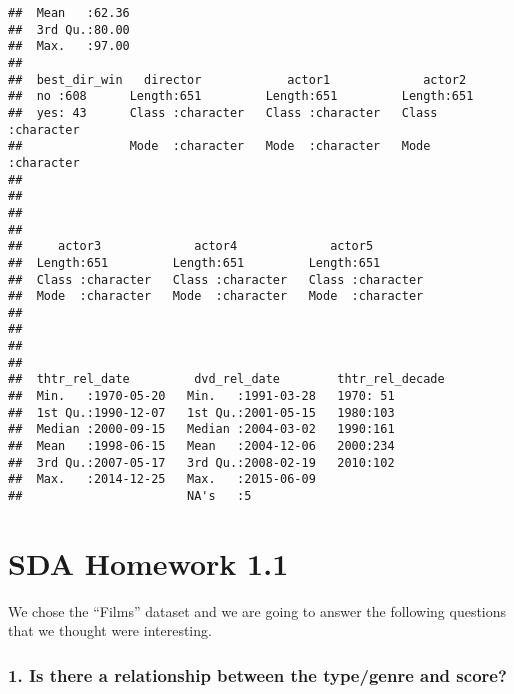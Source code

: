 \documentclass[]{article}
\begin{document}
\begin{verbatim}
##  Mean   :62.36                                                            
##  3rd Qu.:80.00                                                            
##  Max.   :97.00                                                            
##                                                                           
##  best_dir_win   director            actor1             actor2         
##  no :608      Length:651         Length:651         Length:651        
##  yes: 43      Class :character   Class :character   Class :character  
##               Mode  :character   Mode  :character   Mode  :character  
##                                                                       
##                                                                       
##                                                                       
##                                                                       
##     actor3             actor4             actor5         
##  Length:651         Length:651         Length:651        
##  Class :character   Class :character   Class :character  
##  Mode  :character   Mode  :character   Mode  :character  
##                                                          
##                                                          
##                                                          
##                                                          
##  thtr_rel_date         dvd_rel_date        thtr_rel_decade
##  Min.   :1970-05-20   Min.   :1991-03-28   1970: 51       
##  1st Qu.:1990-12-07   1st Qu.:2001-05-15   1980:103       
##  Median :2000-09-15   Median :2004-03-02   1990:161       
##  Mean   :1998-06-15   Mean   :2004-12-06   2000:234       
##  3rd Qu.:2007-05-17   3rd Qu.:2008-02-19   2010:102       
##  Max.   :2014-12-25   Max.   :2015-06-09                  
##                       NA's   :5
\end{verbatim}

\section{SDA Homework 1.1}\label{sda-homework-1.1}

We chose the ``Films'' dataset and we are going to answer the following
questions that we thought were interesting.

\subsubsection{1. Is there a relationship between the type/genre and
score?}\label{is-there-a-relationship-between-the-typegenre-and-score}
\end{document}
